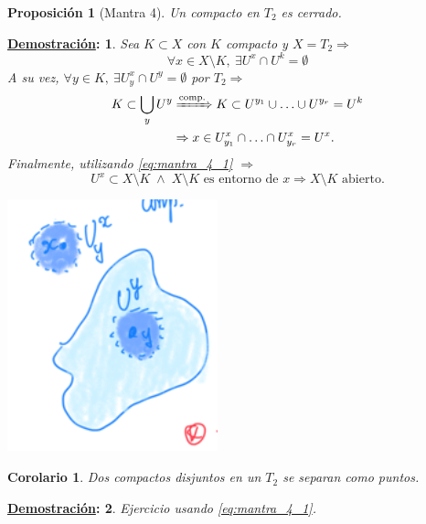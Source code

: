 \documentclass[10pt,a4paper,openright]{book}
\theoremstyle{break}
\newtheorem*{coro}{Corolario}
\newtheorem*{prop}{Proposición}
\newtheorem*{demo}{\underline{Demostración}:}
\begin{document}
\begin{prop}[Mantra 4]
Un compacto en $T_2$ es cerrado. 
\end{prop}
\begin{demo}
Sea $K \subset X$ con $K$ compacto y $X = T_2 \Rightarrow$
\begin{equation} \label{eq:mantra_4_1}
    \forall x \in X \setminus K,\ \exists U^x \cap U^k = \emptyset
\end{equation}
A su vez, $\forall y \in K,\ \exists U_y^x \cap U^y = \emptyset$ por $T_2 \Rightarrow$
\begin{align*}
    K \subset \bigcup_{y} U^y &\xRightarrow{\text{comp.}} K \subset U^{y_1} \cup \ldots \cup U^{y_r} = U^k\\
    &\Rightarrow x \in U_{y_1}^x \cap \ldots \cap U_{y_r}^x = U^x
.\end{align*}
Finalmente, utilizando \ref{eq:mantra_4_1} $\Rightarrow$
\[
    U^x \subset X \setminus K\; \land \;X\setminus K \text{ es entorno de } x \Rightarrow X \setminus K \text{ abierto.} 
\]
\begin{center}
    \includegraphics[scale=0.3]{images/mantra_4} 
\end{center}
\end{demo}
\begin{coro}
Dos compactos disjuntos en un $T_2$ se separan como puntos.
\end{coro}
\begin{demo}
    Ejercicio usando \ref{eq:mantra_4_1}.
\end{demo}
\end{document}
